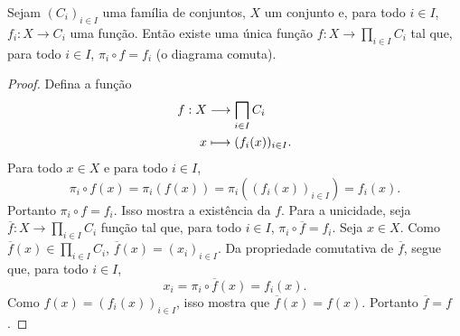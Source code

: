 \begin{prop}
Sejam $(C_i)_{i \in I}$ uma família de conjuntos, $X$ um conjunto e, para todo $i \in I$, $f_i: X \to C_i$ uma função. Então existe uma única função $f: X \to \prod_{i \in I} C_i$ tal que, para todo $i \in I$, $\pi_i \circ f = f_i$ (o diagrama comuta).
\begin{figure}
\centering
{}
\end{figure}
\end{prop}
\begin{proof}
Defina a função
	\begin{align*}
	\func{f}{X}{\prod_{i \in I} C_i}{x}{(f_i(x))_{i \in I}}.
	\end{align*}
Para todo $x \in X$ e para todo $i \in I$,
	\begin{equation*}
	\pi_i \circ f(x) = \pi_i (f(x)) = \pi_i ((f_i(x))_{i \in I}) = f_i(x).
	\end{equation*}
Portanto $\pi_i \circ f = f_i$. Isso mostra a existência da $f$. Para a unicidade, seja $\overline{f}: X \to \prod_{i \in I} C_i$ função tal que, para todo $i \in I$, $\pi_i \circ \overline{f} = f_i$. Seja $x \in X$.  Como $\overline{f}(x) \in \prod_{i \in I} C_i$, $\overline{f}(x) = (x_i)_{i \in I}$. Da propriedade comutativa de $\overline{f}$, segue que, para todo $i \in I$,
	\begin{equation*}
	x_i = \pi_i \circ \overline{f}(x) = f_i(x).
	\end{equation*}
Como $f(x) = (f_i(x))_{i \in I}$, isso mostra que $\overline{f}(x) = f(x)$. Portanto $\overline{f} = f$.
\end{proof}




